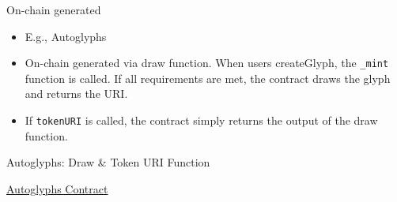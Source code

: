 \documentclass[handout]{beamer}
\begin{document}
\begin{frame}{On-chain generated}
	\begin{itemize}
		\item E.g., Autoglyphs
		\item On-chain generated via draw function. When users createGlyph, the \texttt{\_mint} function is called. If all requirements are met, the contract draws the glyph and returns the URI.
		\item If \texttt{tokenURI} is called, the contract simply returns the output of the draw function.
	\end{itemize}
	\begin{samplecode}{Autoglyphs: Draw \& Token URI Function}
		
	\end{samplecode}
	\vspace{-0.5em}
	\begin{center}
		\link \href{https://etherscan.io/address/0xd4e4078ca3495de5b1d4db434bebc5a986197782}{Autoglyphs Contract}
	\end{center}
\end{frame}
\end{document}
